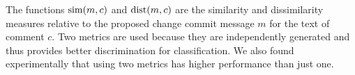 The functions $\operatorname{sim}(m,c)$ and $\operatorname{dist}(m,c)$ are the similarity and dissimilarity measures relative to the proposed change commit message $m$ for the text of comment $c$.
Two metrics are used because they are independently generated and thus provides better discrimination for classification.
We also found experimentally that using two metrics has higher performance than just one. 


%
%
%
%
